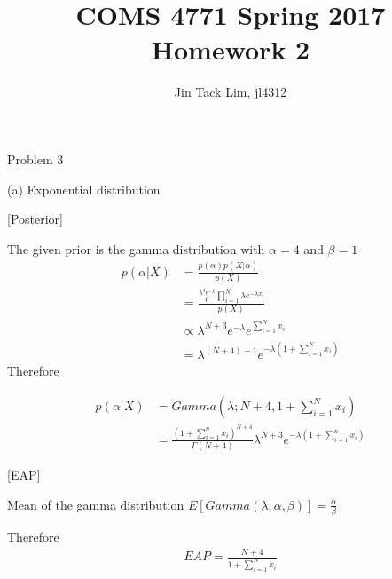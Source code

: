 \documentclass[11pt]{article}
\title{COMS 4771 Spring 2017 Homework 2}
\author{Jin Tack Lim, jl4312
  }
\date{%
  }
\theoremstyle{definition}
\begin{document}
\maketitle



\newcommand{\gau}[3]{
$\frac{1}{{ \sqrt {2\pi #3 ^2} }}e^{ \frac { - \left( {#1 - #2 } \right)^2 } {2#3 ^2}}$
}

\newcommand{\gauraw}[3]{
\frac{1}{{ \sqrt {2\pi #3 ^2} }}e^{ \frac { - \left( {#1 - #2 } \right)^2 } {2#3 ^2}}
}


Problem 3

(a) Exponential distribution

[Posterior]

The given prior is the gamma distribution with $\alpha = 4$ and $\beta = 1$
\begin{equation*}
\begin{split}
 p(\alpha | X ) & =  \frac{p(\alpha)p(X|\alpha)}{p(X)} \\
 & = \frac{\frac{\lambda^3 e^{-\lambda}}{6} \prod_{i=1}^{N} \lambda e^{-\lambda x_i}} {p(X)} \\
 & \propto {\lambda^{N+3} e^{-\lambda} e^{\sum_{i=1}^{N} x_i}} \\
 & = {\lambda^{(N+4) -1} e^{-\lambda(1+\sum_{i=1}^{N} x_i)} } 
\end{split}
\end{equation*}
Therefore

\begin{equation*}
\begin{split}
 p(\alpha | X ) & =  Gamma(\lambda; N+4, 1+\sum_{i=1}^{N} x_i)  \\
& = \frac{(1+\sum_{i=1}^{n} x_i)^{N+4}}{\Gamma(N+4)} \lambda^{N+3} e^{-\lambda(1+\sum_{i=1}^{n} x_i)}
\end{split}
\end{equation*}


[EAP]

Mean of the gamma distribution $E[Gamma(\lambda;\alpha, \beta)] = \frac{\alpha}{\beta}$

Therefore
\begin{equation*}
\begin{split}
EAP = \frac{N+4}{1+\sum_{i=1}^{N} x_i}
\end{split}
\end{equation*}
\end{document}
